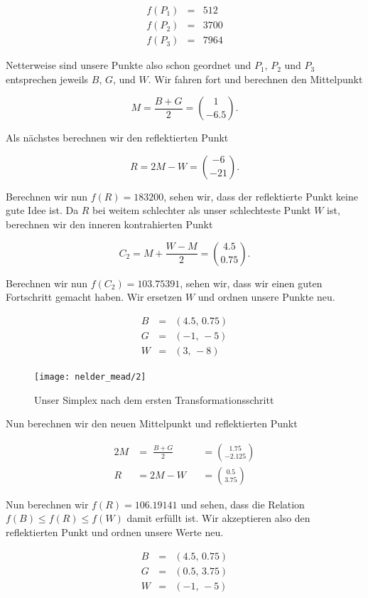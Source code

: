 \documentclass[naustrian]{article}
\begin{document}
{\begin{eqnarray*}
    f(P_{1}) & = & 512\\
    f(P_{2}) & = & 3700\\
    f(P_{3}) & = & 7964
\end{eqnarray*}

Netterweise sind unsere Punkte also schon geordnet und $P_{1}$, $P_{2}$ und
$P_{3}$ entsprechen jeweils $B$, $G$, und $W$. Wir fahren fort und berechnen
den Mittelpunkt

\[
    M = \frac{B + G}{2} = \binom{1}{-6.5}.
\]

Als nächstes berechnen wir den reflektierten Punkt

\[
    R = 2M - W = \binom{-6}{-21}.
\]

Berechnen wir nun $f(R) = 183200$, sehen wir, dass der reflektierte Punkt keine
gute Idee ist. Da $R$ bei weitem schlechter als unser schlechteste Punkt $W$
ist, berechnen wir den inneren kontrahierten Punkt

\[
    C_{2} = M + \frac{W - M}{2} = \binom{4.5}{0.75}.
\]

Berechnen wir nun $f(C_{2}) = 103.75391$, sehen wir, dass
wir einen guten Fortschritt gemacht haben. Wir ersetzen
$W$ und ordnen unsere Punkte neu.

\begin{eqnarray*}
    B & = & (4.5, \, 0.75)\\
    G & = & (-1,\,-5)\\
    W & = & (3,\,-8)
\end{eqnarray*}

\begin{figure}[h]
    \centering
    \texttt{[image: nelder\_mead/2]}
    \caption{Unser Simplex nach dem ersten Transformationsschritt}
\end{figure}

Nun berechnen wir den neuen Mittelpunkt und reflektierten Punkt

\begin{alignat*}{2}
    M &= \;\frac{B + G}{2} &&= \binom{1.75}{-2.125}\\
    R &= 2M - W &&= \binom{0.5}{3.75}
\end{alignat*}

Nun berechnen wir $f(R) = 106.19141$ und sehen, dass die Relation $f(B) \leq
f(R) \leq f(W)$ damit erfüllt ist. Wir akzeptieren also den reflektierten Punkt
und ordnen unsere Werte neu.

\begin{eqnarray*}
    B & = & (4.5, \, 0.75)\\
    G & = & (0.5,\,3.75)\\
    W & = & (-1,\,-5)
\end{eqnarray*}

}
\end{document}
